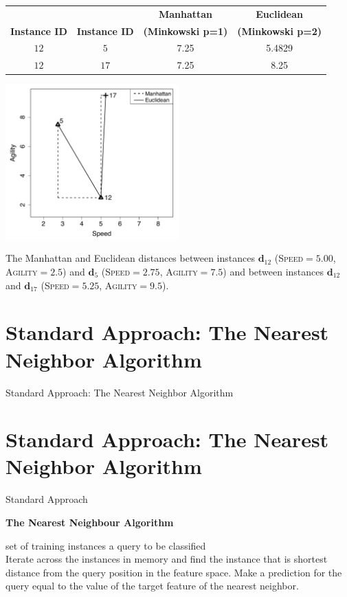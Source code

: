 \documentclass[xcolor={table}]{beamer}
\newcommand{\SectionSlideShortHeader}[3][]{
	\ifthenelse{\isempty{#1}}
		{\section[#3]{#2}\begin{frame} \begin{center}\begin{huge}#2\end{huge}\end{center}\end{frame}}
		{\section[#1]{#2}\begin{frame} \begin{center}\begin{huge}#3\end{huge}\end{center}\end{frame}}
}
\newcommand{\featN}[1]{\textsc{#1}}
\begin{document}
       
\begin{frame} [plain]
	\begin{example}
		\centering
		\begin{footnotesize}
			\begin{tabular}{c c  c  c }
			\hline
			 & & \textbf{Manhattan} & \textbf{Euclidean}\\
			\textbf{Instance ID} & \textbf{Instance ID} & \textbf{(Minkowski p=1)} & \textbf{(Minkowski p=2)}\\
			\hline
			$12$ & $5$ & 7.25 & 5.4829	 \\
			$12$ & $17$ & 7.25 & 8.25 \\
			\hline
			\end{tabular}
		\end{footnotesize}
			
       	\includegraphics[width=0.5\textwidth]{images/manhattan_euclidean_2.pdf}
    		
			
			\footnotesize The Manhattan and Euclidean distances between instances $\mathbf{d}_{12}$ (\featN{Speed}$= 5.00$, \featN{Agility}$=2.5$) and $\mathbf{d}_{5}$ (\featN{Speed}$=2.75$, \featN{Agility}$=7.5$) and between instances $\mathbf{d}_{12}$ and $\mathbf{d}_{17}$ (\featN{Speed}$=5.25$, \featN{Agility}$=9.5$).
	\end{example}
\end{frame} 

\SectionSlideShortHeader{Standard Approach: The Nearest Neighbor Algorithm}{Standard Approach}

\begin{frame}
\begin{center} \textbf{The Nearest Neighbour Algorithm} \end{center}
\begin{algorithmic}[1]
\REQUIRE set of training instances
\REQUIRE a query to be classified
\\
\STATE Iterate across the instances in memory and find the instance that is shortest distance from the query position in the feature space.
\STATE Make a prediction for the query equal to the value of the target feature of the nearest neighbor.
\end{algorithmic}

~ \\

\end{frame}
\end{document}
